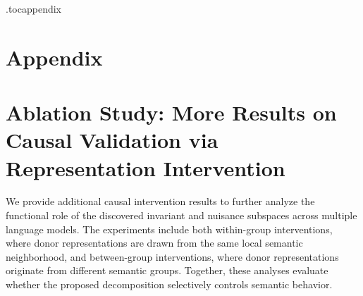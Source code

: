 \hypersetup{
    hidelinks
}

\appendix
\etocdepthtag.toc{appendix}

\section*{Appendix}

\begingroup
{}
\etocsettocstyle{}{}
\tableofcontents
\endgroup



\section{Ablation Study: More Results on Causal Validation via Representation Intervention}
\label{append: between_group}

We provide additional causal intervention results to further analyze the functional role of the discovered invariant and nuisance subspaces across multiple language models. The experiments include both within-group interventions, where donor representations are drawn from the same local semantic neighborhood, and between-group interventions, where donor representations originate from different semantic groups. Together, these analyses evaluate whether the proposed decomposition selectively controls semantic behavior.

